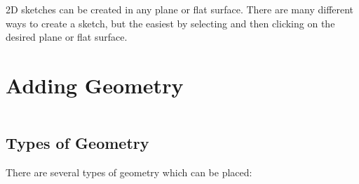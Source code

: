 2D sketches can be created in any plane or flat surface. There are many different ways to create a sketch, but the easiest by selecting  and then clicking on the desired plane or flat surface.

\section{Adding Geometry}

$ $

\subsection{Types of Geometry}

There are several types of geometry which can be placed:

